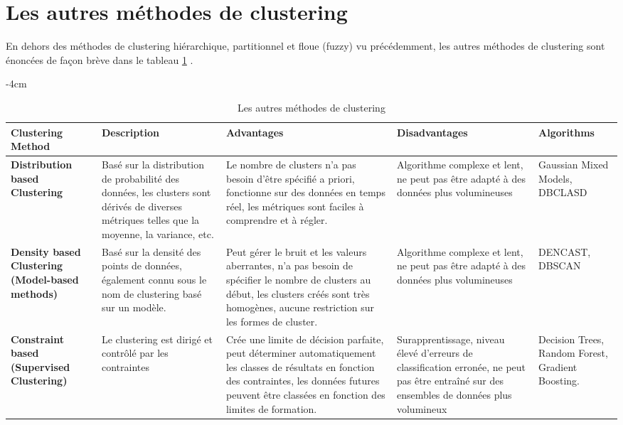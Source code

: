 \section{Les autres méthodes de clustering}
En dehors des méthodes de clustering hiérarchique, partitionnel et floue (fuzzy) vu précédemment, les autres méthodes de clustering sont énoncées de façon brève dans le tableau \ref{other_clustering_methods} . 
\begin{table}[H]
	\centering
	\addtolength{\leftskip} {-4cm}
	\addtolength{\rightskip}{-3cm}
	\begin{tabular}{|m{3cm}|m{4cm}|m{5cm}|m{3cm}|m{3cm}|} %
	\hline
	\rowcolor{blueforest}
	\color{white} \textbf{Clustering Method} & \color{white} \textbf{Description} & \color{white} \textbf{Advantages} & \color{white} \textbf{Disadvantages} & \color{white} \textbf{Algorithms}\\
	\hline\hline
	\textbf{Distribution based Clustering}  & Basé sur la distribution de probabilité des données, les clusters sont dérivés de diverses métriques telles que la moyenne, la variance, etc. & Le nombre de clusters n'a pas besoin d'être spécifié a priori, fonctionne sur des données en temps réel, les métriques sont faciles à comprendre et à régler. & Algorithme complexe et lent, ne peut pas être adapté à des données plus volumineuses & Gaussian Mixed Models, DBCLASD\\ \hline
	\textbf{Density based Clustering (Model-based methods)} & Basé sur la densité des points de données, également connu sous le nom de clustering basé sur un modèle. & Peut gérer le bruit et les valeurs aberrantes, n'a pas besoin de spécifier le nombre de clusters au début, les clusters créés sont très homogènes, aucune restriction sur les formes de cluster.  & Algorithme complexe et lent, ne peut pas être adapté à des données plus volumineuses & DENCAST, DBSCAN \\ \hline
	\textbf{Constraint based (Supervised Clustering)} & Le clustering est dirigé et contrôlé par les contraintes & Crée une limite de décision parfaite, peut déterminer automatiquement les classes de résultats en fonction des contraintes, les données futures peuvent être classées en fonction des limites de formation. & Surapprentissage, niveau élevé d'erreurs de classification erronée, ne peut pas être entraîné sur des ensembles de données plus volumineux & Decision Trees, Random Forest, Gradient Boosting. \\ \hline
	\end{tabular}
	\caption{Les autres méthodes de clustering}
	\label{other_clustering_methods}
\end{table}

